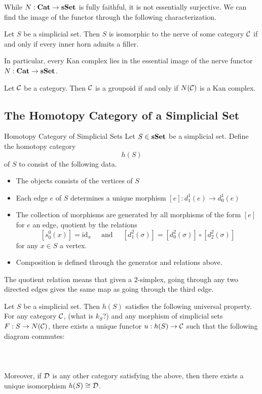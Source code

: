 \documentclass[a4paper]{article}
\begin{document}
While $N:\bold{Cat}\to\bold{sSet}$ is fully faithful, it is not essentially surjective. We can find the image of the functor through the following characterization. 

\begin{prp}{}{} Let $S$ be a simplicial set. Then $S$ is isomorphic to the nerve of some category $\mathcal{C}$ if and only if every inner horn admits a filler. 
\end{prp}

In particular, every Kan complex lies in the essential image of the nerve functor $N:\bold{Cat}\to\bold{sSet}$. 

\begin{lmm}{}{} Let $\mathcal{C}$ be a category. Then $\mathcal{C}$ is a groupoid if and only if $N(\mathcal{C})$ is a Kan complex. 
\end{lmm}

\subsection{The Homotopy Category of a Simplicial Set}
\begin{defn}{Homotopy Category of Simplicial Sets}{} Let $S\in\bold{sSet}$ be a simplicial set. Define the homotopy category $$h(S)$$ of $S$ to consist of the following data. 
\begin{itemize}
\item The objects consists of the vertices of $S$
\item Each edge $e$ of $S$ determines a unique morphism $[e]:d_1^1(e)\to d_0^1(e)$
\item The collection of morphisms are generated by all morphisms of the form $[e]$ for $e$ an edge, quotient by the relations $$[s_0^0(x)]=\text{id}_x\;\;\;\;\text{ and }\;\;\;\;[d_1^2(\sigma)]=[d_0^2(\sigma)]\circ[d_2^2(\sigma)]$$ for any $x\in S$ a vertex. 
\item Composition is defined through the generator and relations above. 
\end{itemize}
\end{defn}

The quotient relation means that given a $2$-simplex, going through any two directed edges gives the same map as going through the third edge. 

\begin{prp}{}{} Let $S$ be a simplicial set. Then $h(S)$ satisfies the following universal property. For any category $\mathcal{C}$, (what is $k_S$?) and any morphism of simplicial sets $F:S\to N(\mathcal{C})$, there exists a unique functor $u:h(S)\to\mathcal{C}$ such that the following diagram commutes: \\~\\
\\~\\
Moreover, if $\mathcal{D}$ is any other category satisfying the above, then there exists a unique isomorphism $h(S)\cong\mathcal{D}$. 
\end{prp}
\end{document}
